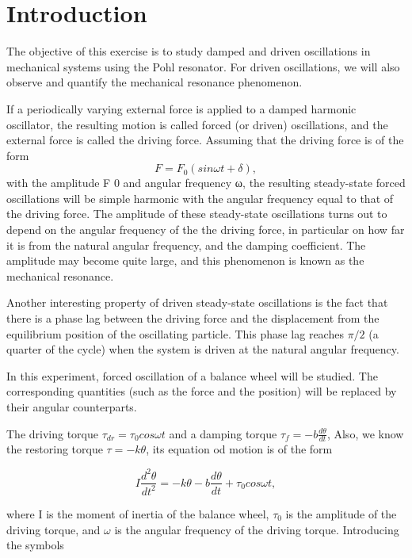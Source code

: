 \section{Introduction}

The objective of this exercise is to study damped and driven oscillations in
mechanical systems using the Pohl resonator. For driven oscillations, we will
also observe and quantify the mechanical resonance phenomenon. 
    
If a periodically varying external force is applied to a damped harmonic
oscillator, the resulting motion is called forced (or driven) oscillations, and
the external force is called the driving force. Assuming that the driving force
is of the form 
    \[
        F=F_0(sin\omega t+\delta),
    \]
with the amplitude F 0 and angular frequency ω, the resulting steady-state
forced oscillations will be simple harmonic with the angular frequency equal to
that of the driving force. The amplitude of these steady-state oscillations
turns out to depend on the angular frequency of the the driving force, in
particular on how far it is from the natural angular frequency, and the damping
coefficient. The amplitude may become quite large, and this phenomenon is known
as the mechanical resonance. 

Another interesting property of driven steady-state oscillations is the fact
that there is a phase lag between the driving force and the displacement from
the equilibrium position of the oscillating particle. This phase lag reaches
$\pi/2$ (a quarter of the cycle) when the system is driven at the natural
angular frequency.
    
In this experiment, forced oscillation of a balance wheel will be studied. The
corresponding quantities (such as the force and the position) will be replaced
by their angular counterparts. 

The driving torque $\tau_{dr}=\tau_0cos\omega t$ and a damping torque
$\tau_f=-b\frac{d\theta}{dt}$, Also, we know the restoring torque
$\tau=-k\theta$, its equation od motion is of the form 

\begin{equation}
\label{1}
I\frac{d^2\theta}{dt^2}=-k\theta-b\frac{d\theta}{dt}+\tau_0cos\omega t,
\end{equation}

where I is the moment of inertia of the balance wheel, $\tau_0$ is the amplitude
of the driving torque, and $\omega$ is the angular frequency of the driving
torque. Introducing the symbols 


